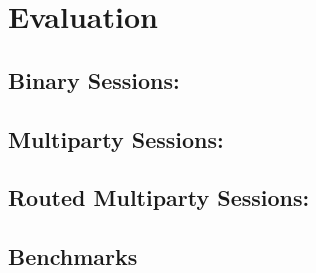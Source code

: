 \chapter{Evaluation}

\section{Binary Sessions: }

\section{Multiparty Sessions: }

\section{Routed Multiparty Sessions: }

\section{Benchmarks}